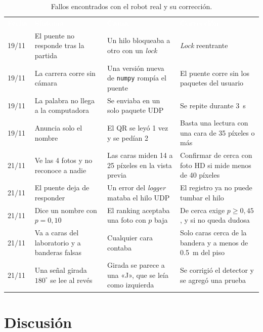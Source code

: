 \documentclass[11pt,a4paper]{article}
\newcommand{\cab}[1]{\textcolor{white}{\textbf{#1}}}
\newcommand{\tabestilo}{\small\setlength{\tabcolsep}{5pt}\renewcommand{\arraystretch}{1.25}%
  \setlength{\aboverulesep}{0pt}\setlength{\belowrulesep}{0pt}\arrayrulecolor{cAcc}}
\begin{document}
\begin{table}[!htbp]
  \centering
  \caption{Fallos encontrados con el robot real y su corrección.}
  \label{tab:fallos}
  \tabestilo
  \begin{tabular}{L{1.0cm}L{4.3cm}L{4.5cm}L{4.5cm}}
    \toprule
    \cab{Fecha} & \cab{Síntoma} & \cab{Causa} & \cab{Corrección} \\
    19/11 & El puente no responde tras la partida & Un hilo bloqueaba a otro con un \textit{lock} & \textit{Lock} reentrante \\
    19/11 & La carrera corre sin cámara & Una versión nueva de \texttt{numpy} rompía el puente & El puente corre sin los paquetes del usuario \\
    19/11 & La palabra no llega a la computadora & Se enviaba en un solo paquete UDP & Se repite durante \SI{3}{\second} \\
    19/11 & Anuncia solo el nombre & El QR se leyó 1 vez y se pedían 2 & Basta una lectura con una cara de 35 píxeles o más \\
    21/11 & Ve las 4 fotos y no reconoce a nadie & Las caras miden 14 a 25 píxeles en la vista previa & Confirmar de cerca con foto HD si mide menos de 40 píxeles \\
    21/11 & El puente deja de responder & Un error del \textit{logger} mataba el hilo UDP & El registro ya no puede tumbar el hilo \\
    21/11 & Dice un nombre con $p = 0{,}10$ & El ranking aceptaba una foto con $p$ baja & De cerca exige $p \ge 0{,}45$, y si no queda dudosa \\
    21/11 & Va a caras del laboratorio y a banderas falsas & Cualquier cara contaba & Solo caras cerca de la bandera y a menos de \SI{0,5}{\meter} del piso \\
    21/11 & Una señal girada $180^\circ$ se lee al revés & Girada se parece a una «J», que se leía como izquierda & Se corrigió el detector y se agregó una prueba \\
    \bottomrule
  \end{tabular}
\end{table}

\section{Discusión}
\end{document}
